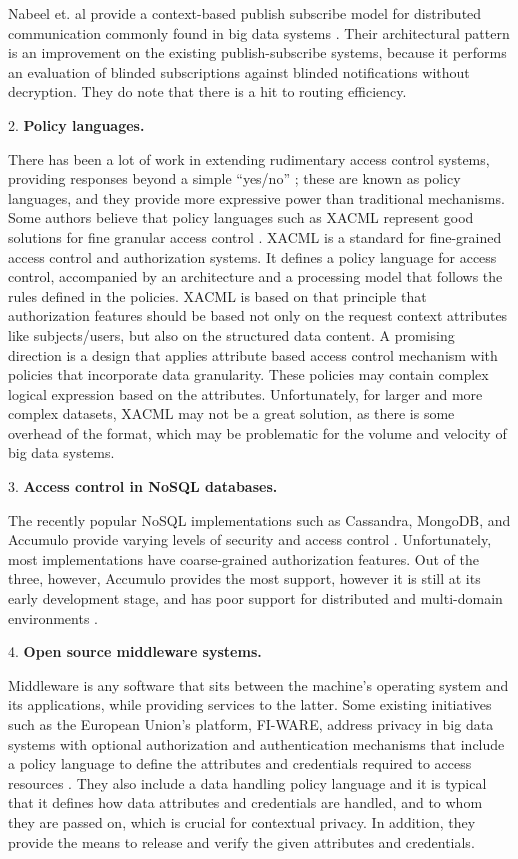\documentclass{sigchi}
\begin{document}
Nabeel et. al provide a context-based publish subscribe model for distributed communication commonly found in big data systems \cite{nabeel2013privacy}. Their architectural pattern is an improvement on the existing publish-subscribe systems, because it performs an evaluation of blinded subscriptions against blinded notifications without decryption. They do note that there is a hit to routing efficiency.

2. \textbf{Policy languages.}

There has been a lot of work in extending rudimentary access control systems, providing responses beyond a simple ``yes/no'' \cite{hull2004enabling}; these are known as policy languages, and they provide more expressive power than traditional mechanisms. Some authors believe that policy languages such as XACML represent good solutions for fine granular access control \cite{demchenko2013big}. XACML is a standard for fine-grained access control and authorization systems. It defines a policy language for access control, accompanied by an architecture and a processing model that follows the rules defined in the policies. XACML is based on that principle that authorization features should be based not only on the request context attributes like subjects/users, but also on the structured data content. A promising direction is a design that applies attribute based access control mechanism with policies that incorporate data granularity. These policies may contain complex logical expression based on the attributes. Unfortunately, for larger and more complex datasets, XACML may not be a great solution, as there is some overhead of the format, which may be problematic for the volume and velocity of big data systems.

3. \textbf{Access control in NoSQL databases.}

The recently popular NoSQL implementations such as Cassandra, MongoDB, and Accumulo provide varying levels of security and access control \cite{demchenko2013big}. Unfortunately, most implementations have coarse-grained authorization features. Out of the three, however, Accumulo provides the most support, however it is still at its early development stage, and has poor support for distributed and multi-domain environments \cite{demchenko2013big}.

4. \textbf{Open source middleware systems.} 

Middleware is any software that sits between the machine's operating system and its applications, while providing services to the latter. Some existing initiatives such as the European Union's platform, FI-WARE, address privacy in big data systems with optional authorization and authentication mechanisms that include a policy language to define the attributes and credentials required to access resources \cite{skarmeta2013internet}. They also include a data handling policy language and it is typical that it defines how data attributes and credentials are handled, and to whom they are passed on, which is crucial for contextual privacy. In addition, they provide the means to release and verify the given attributes and credentials.
\end{document}
